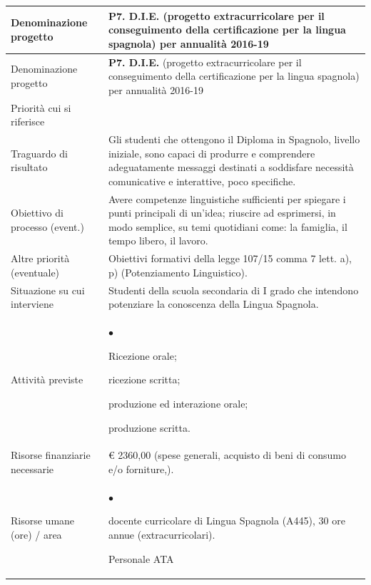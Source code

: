 \documentclass[12pt,a4paper,oneside]{memoir}
\newenvironment{elenco}{\begin{list}{$\bullet$}{%
              \setlength{\leftmargin}{4mm}%
              \setlength{\rightmargin}{1mm}%
               \setlength{\itemindent}{0mm}%
               \setlength{\labelwidth}{2mm}%
               \setlength{\labelsep}{2mm}%
              \setlength{\itemsep}{-\parsep}%
              \setlength{\partopsep}{0pt}%
              \setlength{\topsep}{0pt}%
             \setlength{\parskip}{0pt}%
              }}{\end{list}}
\begin{document}
\begin{footnotesize}
\begin{longtable}{|>{\raggedright}p{2.5cm}|>{\raggedright\arraybackslash}P{10cm}|}
\hline
{}
\label{P7}Denominazione progetto&\textbf{P7. D.I.E.} (progetto extracurricolare per il conseguimento della certificazione per la lingua spagnola) per annualità 2016-19\\ \hline \endfirsthead
\hline
{}
Denominazione progetto&\textbf{P7. D.I.E.} (progetto extracurricolare per il conseguimento della certificazione per la lingua spagnola) per annualità 2016-19\\ \hline \endhead
{}
\endfoot
\hline
\endlastfoot
Priorità cui si riferisce&\\ \hline
Traguardo di risultato&Gli studenti che ottengono il Diploma in Spagnolo, livello iniziale, sono capaci di produrre e comprendere adeguatamente messaggi destinati a soddisfare necessità comunicative e interattive, poco specifiche.\\ \hline
Obiettivo di processo (event.) &Avere competenze linguistiche sufficienti per spiegare i punti principali di un'idea; riuscire ad esprimersi, in modo semplice, su temi quotidiani come: la famiglia, il tempo libero, il lavoro.\\ \hline
Altre priorità (eventuale)&Obiettivi formativi della legge 107/15 comma 7 lett. a), p) (Potenziamento Linguistico).\\ \hline
Situazione su cui interviene&Studenti della scuola secondaria di I grado che intendono potenziare la conoscenza della Lingua Spagnola.\\ \hline
Attività previste&
\begin{elenco}
\item Ricezione orale;
\item ricezione scritta;
\item produzione ed interazione orale;
\item produzione scritta.
\end{elenco}\\[-4mm] \hline
Risorse finanziarie necessarie&€ 2360,00 (spese generali, acquisto di beni di consumo e/o forniture,).\\ \hline
Risorse umane (ore) / area&
\begin{elenco}
\item docente curricolare di Lingua Spagnola (A445), 30 ore annue (extracurricolari).
\item Personale ATA

\end{elenco}
\end{longtable}
\end{footnotesize}
\end{document}
